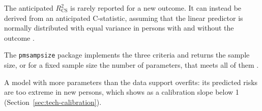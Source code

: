 The anticipated $R^2_{\mathrm{CS}}$ is rarely reported for a new outcome.
It can instead be derived from an anticipated C-statistic, assuming that the linear predictor is normally distributed with equal variance in persons with and without the outcome .

The \texttt{pmsampsize} package implements the three criteria and returns the sample size, or for a fixed sample size the number of parameters, that meets all of them .

A model with more parameters than the data support overfits: its predicted risks are too extreme in new persons, which shows as a calibration slope below 1 (Section~\ref{sec:tech-calibration}).
